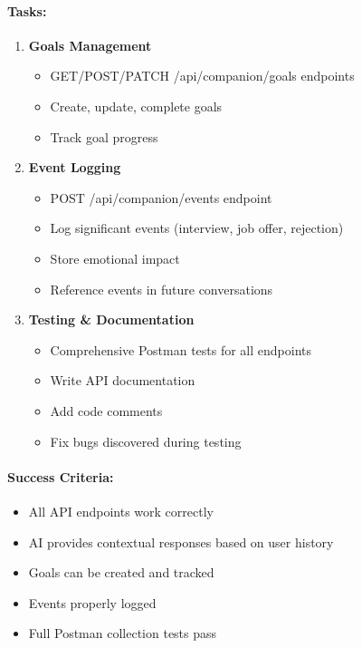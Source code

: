 \documentclass[12pt,a4paper]{article}
\begin{document}
\paragraph{Tasks:}
\begin{enumerate}[leftmargin=*]
    \item \textbf{Goals Management}
    \begin{itemize}
        \item GET/POST/PATCH /api/companion/goals endpoints
        \item Create, update, complete goals
        \item Track goal progress
    \end{itemize}
    
    \item \textbf{Event Logging}
    \begin{itemize}
        \item POST /api/companion/events endpoint
        \item Log significant events (interview, job offer, rejection)
        \item Store emotional impact
        \item Reference events in future conversations
    \end{itemize}
    
    \item \textbf{Testing \& Documentation}
    \begin{itemize}
        \item Comprehensive Postman tests for all endpoints
        \item Write API documentation
        \item Add code comments
        \item Fix bugs discovered during testing
    \end{itemize}
\end{enumerate}

\paragraph{Success Criteria:}
\begin{itemize}
    \item All API endpoints work correctly
    \item AI provides contextual responses based on user history
    \item Goals can be created and tracked
    \item Events properly logged
    \item Full Postman collection tests pass
\end{itemize}
\end{document}
